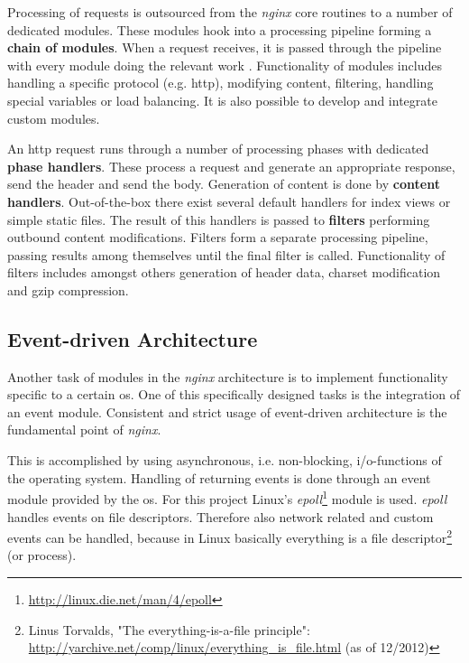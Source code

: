 Processing of requests is outsourced from the \textit{nginx} core routines to a number of dedicated modules. These modules hook into a processing pipeline forming a \textbf{chain of modules}. When a request receives, it is passed through the pipeline with every module doing the relevant work \cite{aosa}. Functionality of modules includes handling a specific protocol (e.g. \gls{http}), modifying content, filtering, handling special variables or load balancing. It is also possible to develop and integrate custom modules.

An \gls{http} request runs through a number of processing phases with dedicated \textbf{phase handlers}. These process a request and generate an appropriate response, send the header and send the body. Generation of content is done by \textbf{content handlers}. Out-of-the-box there exist several default handlers for index views or simple static files. The result of this handlers is passed to \textbf{filters} performing outbound content modifications. Filters form a separate processing pipeline, passing results among themselves until the final filter is called. Functionality of filters includes amongst others generation of header data, charset modification and gzip compression. \cite{aosa}
\\

\subsection{Event-driven Architecture}
\setlength{\intextsep}{12pt plus2pt minus2pt}
Another task of modules in the \textit{nginx} architecture is to implement functionality specific to a certain \gls{os}. One of this specifically designed tasks is the integration of an event module. Consistent and strict usage of event-driven architecture is the fundamental point of \textit{nginx}.

This is accomplished by using asynchronous, i.e. non-blocking, i/o-functions of the operating system. Handling of returning events is done through an event module provided by the \gls{os}. For this project Linux's \textit{epoll}\footnote{\url{http://linux.die.net/man/4/epoll}} module is used. \textit{epoll} handles events on file descriptors. Therefore also network related and custom events can be handled, because in Linux basically everything is a file descriptor\footnote{Linus Torvalds, "The everything-is-a-file principle": \url{http://yarchive.net/comp/linux/everything_is_file.html} (as of 12/2012)} (or process).


